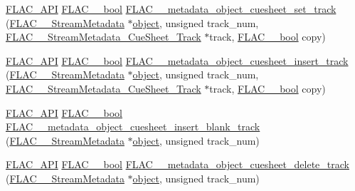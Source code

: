 \begin{DoxyCompactItemize}
\item 
\mbox{\hyperlink{group__flac__export_ga56ca07df8a23310707732b1c0007d6f5}{F\+L\+A\+C\+\_\+\+A\+PI}} \mbox{\hyperlink{ordinals_8h_a95103469f1cbd78b8cf250194985b34e}{F\+L\+A\+C\+\_\+\+\_\+bool}} \mbox{\hyperlink{group__flac__metadata__object_ga682176f845b99956b3974bcc1bb63a20}{F\+L\+A\+C\+\_\+\+\_\+metadata\+\_\+object\+\_\+cuesheet\+\_\+set\+\_\+track}} (\mbox{\hyperlink{struct_f_l_a_c_____stream_metadata}{F\+L\+A\+C\+\_\+\+\_\+\+Stream\+Metadata}} $\ast$\mbox{\hyperlink{_s_d_l__opengl__glext_8h_ab49790263c78300fbf05719e38246198}{object}}, unsigned track\+\_\+num, \mbox{\hyperlink{struct_f_l_a_c_____stream_metadata___cue_sheet___track}{F\+L\+A\+C\+\_\+\+\_\+\+Stream\+Metadata\+\_\+\+Cue\+Sheet\+\_\+\+Track}} $\ast$track, \mbox{\hyperlink{ordinals_8h_a95103469f1cbd78b8cf250194985b34e}{F\+L\+A\+C\+\_\+\+\_\+bool}} copy)
\item 
\mbox{\hyperlink{group__flac__export_ga56ca07df8a23310707732b1c0007d6f5}{F\+L\+A\+C\+\_\+\+A\+PI}} \mbox{\hyperlink{ordinals_8h_a95103469f1cbd78b8cf250194985b34e}{F\+L\+A\+C\+\_\+\+\_\+bool}} \mbox{\hyperlink{group__flac__metadata__object_ga5dbdffac2cd7e327f711103c15e015ac}{F\+L\+A\+C\+\_\+\+\_\+metadata\+\_\+object\+\_\+cuesheet\+\_\+insert\+\_\+track}} (\mbox{\hyperlink{struct_f_l_a_c_____stream_metadata}{F\+L\+A\+C\+\_\+\+\_\+\+Stream\+Metadata}} $\ast$\mbox{\hyperlink{_s_d_l__opengl__glext_8h_ab49790263c78300fbf05719e38246198}{object}}, unsigned track\+\_\+num, \mbox{\hyperlink{struct_f_l_a_c_____stream_metadata___cue_sheet___track}{F\+L\+A\+C\+\_\+\+\_\+\+Stream\+Metadata\+\_\+\+Cue\+Sheet\+\_\+\+Track}} $\ast$track, \mbox{\hyperlink{ordinals_8h_a95103469f1cbd78b8cf250194985b34e}{F\+L\+A\+C\+\_\+\+\_\+bool}} copy)
\item 
\mbox{\hyperlink{group__flac__export_ga56ca07df8a23310707732b1c0007d6f5}{F\+L\+A\+C\+\_\+\+A\+PI}} \mbox{\hyperlink{ordinals_8h_a95103469f1cbd78b8cf250194985b34e}{F\+L\+A\+C\+\_\+\+\_\+bool}} \mbox{\hyperlink{group__flac__metadata__object_ga87855591d933cd6371010a675f0bc629}{F\+L\+A\+C\+\_\+\+\_\+metadata\+\_\+object\+\_\+cuesheet\+\_\+insert\+\_\+blank\+\_\+track}} (\mbox{\hyperlink{struct_f_l_a_c_____stream_metadata}{F\+L\+A\+C\+\_\+\+\_\+\+Stream\+Metadata}} $\ast$\mbox{\hyperlink{_s_d_l__opengl__glext_8h_ab49790263c78300fbf05719e38246198}{object}}, unsigned track\+\_\+num)
\item 
\mbox{\hyperlink{group__flac__export_ga56ca07df8a23310707732b1c0007d6f5}{F\+L\+A\+C\+\_\+\+A\+PI}} \mbox{\hyperlink{ordinals_8h_a95103469f1cbd78b8cf250194985b34e}{F\+L\+A\+C\+\_\+\+\_\+bool}} \mbox{\hyperlink{group__flac__metadata__object_ga3232bae96f19722bee19afd37fdc214d}{F\+L\+A\+C\+\_\+\+\_\+metadata\+\_\+object\+\_\+cuesheet\+\_\+delete\+\_\+track}} (\mbox{\hyperlink{struct_f_l_a_c_____stream_metadata}{F\+L\+A\+C\+\_\+\+\_\+\+Stream\+Metadata}} $\ast$\mbox{\hyperlink{_s_d_l__opengl__glext_8h_ab49790263c78300fbf05719e38246198}{object}}, unsigned track\+\_\+num)

\end{DoxyCompactItemize}
